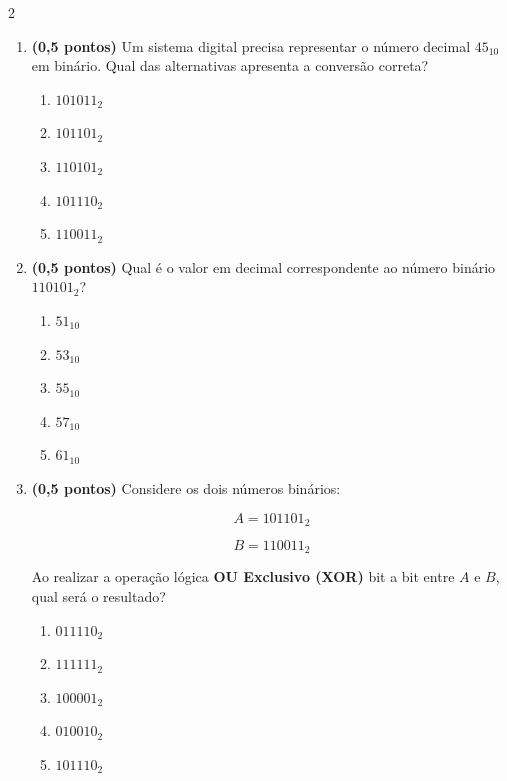 \documentclass[a4paper,12pt]{article}
\begin{document}
\begin{multicols}{2}
\begin{enumerate}[leftmargin=*]
\item \textbf{(0,5 pontos)} Um sistema digital precisa representar o número
decimal $45_{10}$ em binário. Qual das alternativas apresenta a conversão correta?

\begin{enumerate}[label=(\Alph*)]
    \item $101011_2$
    \item $101101_2$
    \item $110101_2$
    \item $101110_2$
    \item $110011_2$
\end{enumerate}

\item \textbf{(0,5 pontos)} Qual é o valor em decimal correspondente ao número binário $110101_2$?

\begin{enumerate}[label=(\Alph*)]
    \item $51_{10}$
    \item $53_{10}$
    \item $55_{10}$
    \item $57_{10}$
    \item $61_{10}$
\end{enumerate}


\item \textbf{(0,5 pontos)} Considere os dois números binários:

\[
A = 101101_2
\]

\[
B = 110011_2
\]

Ao realizar a operação lógica \textbf{OU Exclusivo (XOR)} bit a bit entre
$A$ e $B$, qual será o resultado?

\begin{enumerate}[label=(\Alph*)]
    \item $011110_2$
    \item $111111_2$
    \item $100001_2$
    \item $010010_2$
    \item $101110_2$
\end{enumerate}

\vspace{0.2cm}


\end{enumerate}
\end{multicols}
\end{document}
